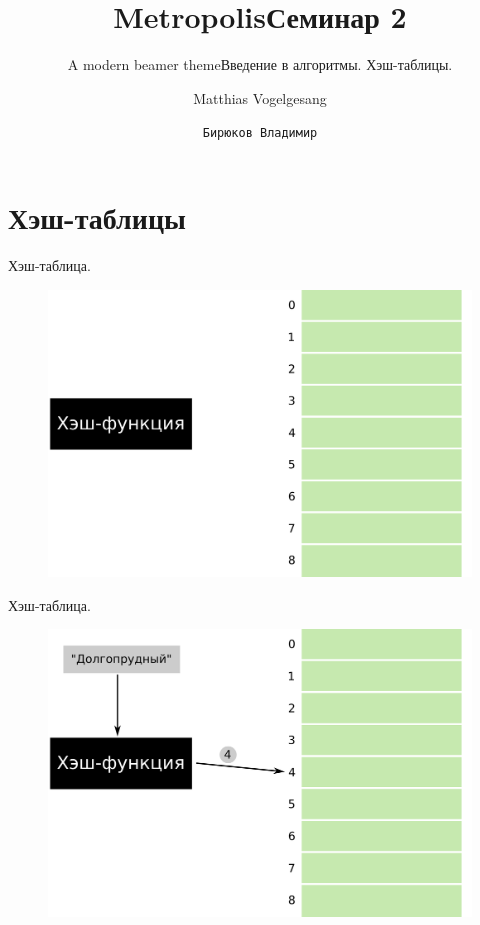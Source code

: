 \documentclass[10pt]{beamer}
\title{Metropolis}
\subtitle{A modern beamer theme}
\date{}
\author{Matthias Vogelgesang}
\institute{Center for modern beamer themes}
\title{Семинар 2}
\subtitle{Введение в алгоритмы. Хэш-таблицы.}
\author{\texttt{Бирюков Владимир}}
\institute{МФТИ}
\begin{document}
%
%

\maketitle


%
%

\section{Хэш-таблицы}


\begin{frame}{Хэш-таблица.}
\begin{figure}
\centerline{\includegraphics[width=0.86\linewidth]{images/hash_1.png}}
\end{figure}
\end{frame}

\begin{frame}{Хэш-таблица.}
\begin{figure}
\centerline{\includegraphics[width=0.86\linewidth]{images/hash_2.png}}
\end{figure}
\end{frame}
\end{document}
